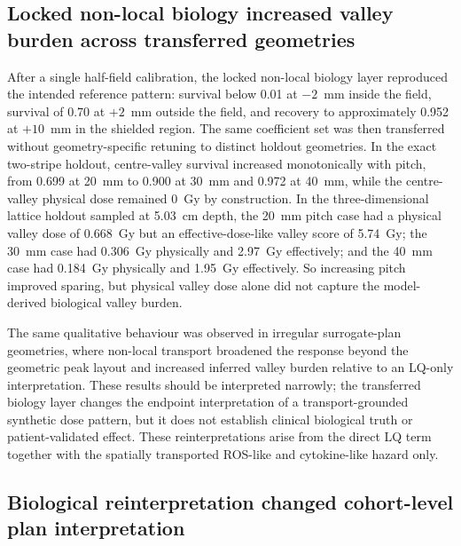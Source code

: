 \documentclass[10pt,a4paper]{article}
\begin{document}
\subsection{Locked non-local biology increased valley burden across transferred geometries}

After a single half-field calibration, the locked non-local biology layer reproduced the intended reference pattern: survival below 0.01 at $-2$~mm inside the field, survival of 0.70 at $+2$~mm outside the field, and recovery to approximately 0.952 at $+10$~mm in the shielded region. The same coefficient set was then transferred without geometry-specific retuning to distinct holdout geometries. In the exact two-stripe holdout, centre-valley survival increased monotonically with pitch, from 0.699 at 20~mm to 0.900 at 30~mm and 0.972 at 40~mm, while the centre-valley physical dose remained 0~Gy by construction. In the three-dimensional lattice holdout sampled at 5.03~cm depth, the 20~mm pitch case had a physical valley dose of 0.668~Gy but an effective-dose-like valley score of 5.74~Gy; the 30~mm case had 0.306~Gy physically and 2.97~Gy effectively; and the 40~mm case had 0.184~Gy physically and 1.95~Gy effectively. So increasing pitch improved sparing, but physical valley dose alone did not capture the model-derived biological valley burden.

The same qualitative behaviour was observed in irregular surrogate-plan geometries, where non-local transport broadened the response beyond the geometric peak layout and increased inferred valley burden relative to an LQ-only interpretation. These results should be interpreted narrowly; the transferred biology layer changes the endpoint interpretation of a transport-grounded synthetic dose pattern, but it does not establish clinical biological truth or patient-validated effect. These reinterpretations arise from the direct LQ term together with the spatially transported ROS-like and cytokine-like hazard only. 

\subsection{Biological reinterpretation changed cohort-level plan interpretation}
\end{document}
